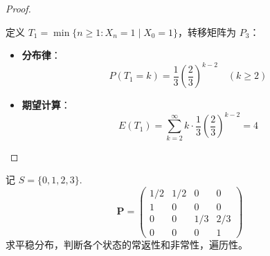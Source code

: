 \documentclass[lang=cn,10pt,thmcnt=section]{elegantbook}
\begin{document}
\begin{proof}
\begin{enumerate}[label=(\arabic*)]
		  定义 $T_1 = \min\{n \geq 1: X_n = 1 \mid X_0 = 1\}$，转移矩阵为 $P_3$：
		  \begin{itemize}
			\item \textbf{分布律}：
			  \[
			  P(T_1 = k) = \frac{1}{3} \left(\frac{2}{3}\right)^{k-2} \quad (k \geq 2)
			  \]
			
			
			\item \textbf{期望计算}：
			  \[
			  E(T_1) = \sum_{k=2}^{\infty} k \cdot \frac{1}{3} \left(\frac{2}{3}\right)^{k-2} = 4
			  \]
		  \end{itemize}
	  \end{enumerate}
	  
\end{proof}
\begin{example}
	记 $S = \{0, 1, 2, 3\}$.
    \[
    \mathbf{P} = \begin{pmatrix}
    1/2 & 1/2 & 0 & 0 \\
    1 & 0 & 0 & 0 \\
    0 & 0 & 1/3 & 2/3 \\
    0 & 0 & 0 & 1
    \end{pmatrix}
    \]
    求平稳分布，判断各个状态的常返性和非常性，遍历性。
\end{example}
\end{document}
